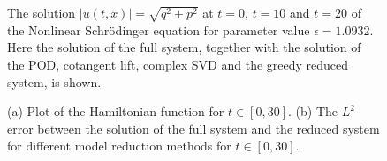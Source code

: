 \begin{figure}
\caption{The solution $|u(t,x)| = \sqrt{q^2 + p^2}$ at $t=0$, $t=10$ and $t=20$ of the Nonlinear Schr\"odinger equation for parameter value $\epsilon = 1.0932$. Here the solution of the full system, together with the solution of the POD, cotangent lift, complex SVD and the greedy reduced system, is shown.}
\label{fig:NuRe:3}
\end{figure}

\begin{figure}

\begin{minipage}{.5\linewidth}
\centering
{}
\end{minipage}%
\begin{minipage}{.5\linewidth}
\centering
{}
\end{minipage}\par\medskip
\centering

\caption{ (a) Plot of the Hamiltonian function for $t \in [0,30]$. (b) The $L^2$ error between the solution of the full system and the reduced system for different model reduction methods for $t \in [0,30]$. }
\label{fig:NuRe:4}
\end{figure}


